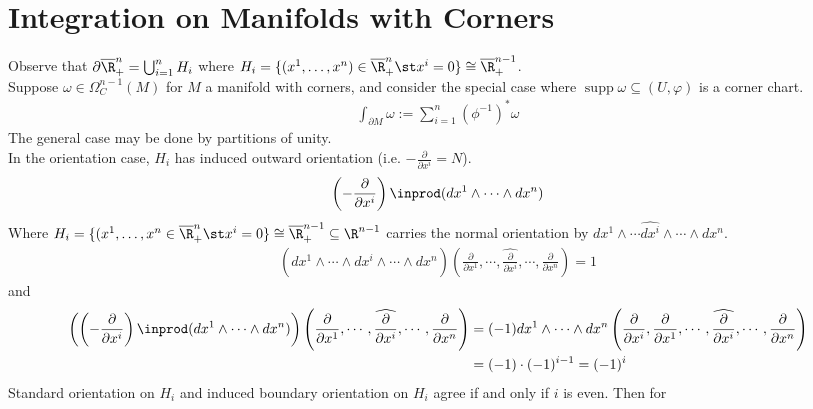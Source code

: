\documentclass[11pt]{article}
\begin{document}
\section*{Integration on Manifolds with Corners}
\label{sec:orga551ddf}
Observe that \(\partial\overline{\R}^{n}_{+}=\bigcup_{i=1}^{n}H_{i}\) where \(H_{i}=\{(x^{1},\ldots,x^{n})\in\overline{\R}^{n}_{+}\st x^{i}=0\}\cong\overline{\R}^{n-1}_{+}\).\\
Suppose \(\omega\in\Omega^{n-1}_{C}(M)\) for \(M\) a manifold with corners, and consider the special case where \(\operatorname{supp}\omega\subseteq(U,\varphi)\) is a corner chart.\\
\begin{align*}
  \int_{\partial M}\omega
  :=\sum_{i=1}^{n}(\phi^{-1})^{*}\omega
\end{align*}
The general case may be done by partitions of unity.\\
In the orientation case, \(H_{i}\) has induced outward orientation (i.e. \(-\frac{\partial}{\partial x^{i}}=N\)).\\
\begin{align*}
  \left( -\frac{\partial}{\partial x^{i}} \right)\inprod(dx^{1}\wedge\cdots\wedge dx^{n})
\end{align*}
Where \(H_{i}=\{(x^{1},\ldots,x^{n}\in\overline{\R}^{n}_{+}\st x^{i}=0\}\cong\overline{\R}^{n-1}_{+}\subseteq\R^{n-1}\) carries the normal orientation by \(dx^{1}\wedge\cdots\widehat{dx^{i}}\wedge\cdots\wedge dx^{n}\).\\
\begin{align*}
  (dx^{1}\wedge\cdots\wedge\widehat{dx^{i}}\wedge\cdots\wedge dx^{n})\left( \frac{\partial}{\partial x^{1}},\cdots,\widehat{\frac{\partial}{\partial x^{i}}},\cdots,\frac{\partial}{\partial x^{n}} \right)
  =1
\end{align*}
and\\
\begin{align*}
  \left( \left( -\frac{\partial}{\partial x^{i}} \right)\inprod(dx^{1}\wedge\cdots\wedge dx^{n}) \right)\left( \frac{\partial}{\partial x^{1}},\cdots,\widehat{\frac{\partial}{\partial x^{i}}},\cdots,\frac{\partial}{\partial x^{n}} \right)
  &=(-1)dx^{1}\wedge\cdots\wedge dx^{n}\left( \frac{\partial}{\partial x^{i}},\frac{\partial}{\partial x^{1}},\cdots,\widehat{\frac{\partial}{\partial x^{i}}},\cdots,\frac{\partial}{\partial x^{n}} \right) \\
  &=(-1)\cdot(-1)^{i-1}
  =(-1)^{i}
\end{align*}
Standard orientation on \(H_{i}\) and induced boundary orientation on \(H_{i}\) agree if and only if \(i\) is even. Then for\\
\end{document}
